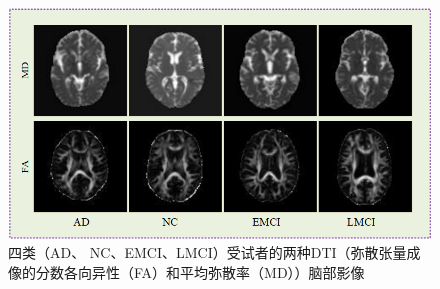    \begin{figure}[htbp]
      \centering
      \includegraphics[width=0.9\linewidth]{figs/fineAD.png}
      \caption{四类（AD、 NC、EMCI、LMCI）受试者的两种DTI（弥散张量成像的分数各向异性（FA）和平均弥散率（MD））脑部影像}\label{fineAD}
    \end{figure}
    
